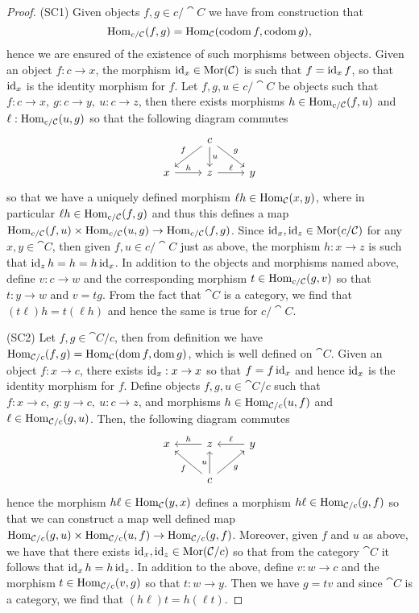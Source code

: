 \begin{proof}
  (SC1) Given objects \(f, g \in c/\cat C\) we have from construction that
  \[
    \operatorname{Hom}_{c/\mathcal C}(f, g) = \operatorname{Hom}_{\mathcal C}(\operatorname{codom} f, \operatorname{codom} g),
  \]
  hence we are
  ensured of the existence of such morphisms between objects. Given an object
  \(f: c \to x\), the morphism \(\operatorname{id}_x \in \operatorname{Mor}(\mathcal C)\) is such that \(f =
  \operatorname{id}_x  f\), so that \(\operatorname{id}_x\) is the identity morphism for \(f\). Let
  \(f, g, u \in c/\cat C\) be objects such that \(f: c \to x,\ g: c \to y,\ u: c
  \to z\), then there exists morphisms \(h \in \operatorname{Hom}_{c/\mathcal C}(f, u)\) and
  \(\ell: \operatorname{Hom}_{c/\mathcal C}(u, g)\) so that the following diagram commutes
  \[
    \begin{tikzcd}
        &c \ar[dl, swap, "f"] \ar[d, "u"] \ar[dr, "g"] & \\
      x \ar[r, "h"]
        &z \ar[r, "\ell"]
          &y
    \end{tikzcd}
  \]
  so that we have a uniquely defined morphism \(\ell  h \in \operatorname{Hom}_{\mathcal
  C}(x, y)\), where in particular \(\ell  h \in \operatorname{Hom}_{c/\mathcal C}(f, g)\) and
  thus this defines a map \(\operatorname{Hom}_{c/\mathcal C}(f, u) \times \operatorname{Hom}_{c/\mathcal C}(u, g)
  \to \operatorname{Hom}_{c/\mathcal C}(f, g)\). Since \(\operatorname{id}_x, \operatorname{id}_z \in \operatorname{Mor}(c/\mathcal C)\) for any
  \(x, y \in \cat C\), then given \(f, u \in c/\cat C\) just as above, the
  morphism \(h: x \to z\) is such that \(\operatorname{id}_z  h = h = h  \operatorname{id}_x\). In
  addition to the objects and morphisms named above, define \(v: c \to w\) and
  the corresponding morphism \(t \in \operatorname{Hom}_{c/\mathcal C}(g, v)\) so that \(t: y \to
  w\) and \(v = t  g\). From the fact that \(\cat C\) is a category, we
  find that \((t  \ell)  h = t  (\ell  h)\) and hence the
  same is true for \(c/\cat C\).

  (SC2) Let \(f, g \in \cat C/c\), then from definition we have \(\operatorname{Hom}_{\mathcal
  C/c}(f, g) = \operatorname{Hom}_{\mathcal C}(\operatorname{dom} f, \operatorname{dom} g)\), which is well defined on \(\cat
  C\). Given an object \(f: x \to c\), there exists \(\operatorname{id}_x: x \to x\) so that
  \(f = f  \operatorname{id}_x\) and hence \(\operatorname{id}_x\) is the identity morphism for \(f\).
  Define objects \(f, g, u \in \cat C/c\) such that \(f: x \to c,\ g: y \to c,\
  u: c \to z\), and morphisms \(h \in \operatorname{Hom}_{\mathcal C/c}(u, f)\) and \(\ell \in
  \operatorname{Hom}_{\mathcal C/c}(g, u)\). Then, the following diagram commutes
   \[
    \begin{tikzcd}
      x
        &z \ar[l, swap, "h"]
          &y \ar[l, swap, "\ell"] \\
        &c \ar[lu, "f"] \ar[u, "u"] \ar[ru, swap, "g"]
    \end{tikzcd}
  \]
  hence the morphism \(h  \ell \in \operatorname{Hom}_{\mathcal C}(y, x)\) defines a morphism
  \(h  \ell \in \operatorname{Hom}_{\mathcal C/c}(g, f)\) so that we can construct a map well
  defined map \(\operatorname{Hom}_{\mathcal C/c}(g, u) \times \operatorname{Hom}_{\mathcal C/c}(u, f) \to
  \operatorname{Hom}_{\mathcal C/c}(g, f)\). Moreover, given \(f\) and \(u\) as above, we have
  that there exists \(\operatorname{id}_x, \operatorname{id}_z \in \operatorname{Mor}(\mathcal C/c)\) so that from the
  category \(\cat C\) it follows that \(\operatorname{id}_x  h = h  \operatorname{id}_z\). In
  addition to the above, define \(v: w \to c\) and the morphism \(t \in
  \operatorname{Hom}_{\mathcal C/c}(v, g)\) so that \(t: w \to y\). Then we have \(g = t  v\)
  and since \(\cat C\) is a category, we find that \((h  \ell)  t = h
   (\ell  t)\).
\end{proof}
